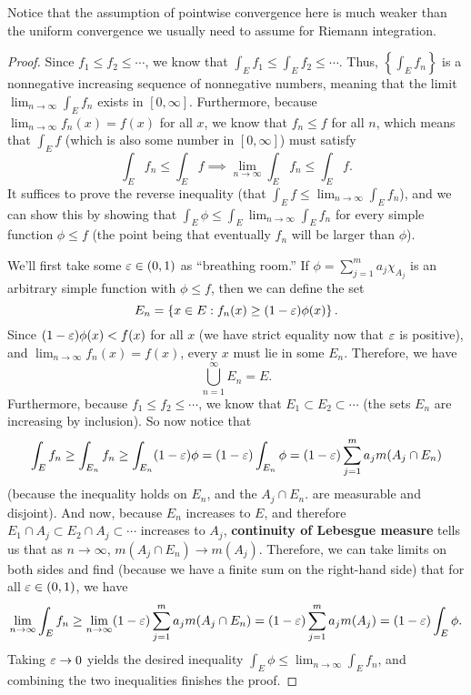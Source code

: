 Notice that the assumption of pointwise convergence here is much weaker than the uniform convergence we usually need to assume for Riemann integration.

\begin{proof}
Since $f_1 \le f_2 \le \cdots$, we know that $\int_E f_1 \le \int_E f_2 \le \cdots$. Thus, $\left\{\int_E f_n\right\}$ is a nonnegative increasing sequence of nonnegative numbers, meaning that the limit $\lim_{n \to \infty} \int_E f_n$ exists in $[0, \infty]$. Furthermore, because $\lim_{n \to \infty} f_n(x) = f(x)$ for all $x$, we know that $f_n \le f$ for all $n$, which means that $\int_E f$ (which is also some number in $[0, \infty]$) must satisfy 
\[
    \int_E f_n \le \int_E f \implies \lim_{n \to \infty}\int_E f_n \le \int_E f.
\]
It suffices to prove the reverse inequality (that $\int_E f \le \lim_{n \to \infty}\int_E f_n$), and we can show this by showing that $\int_E \phi \le \int_E \lim_{n \to \infty}\int_E f_n$ for every simple function $\phi \le f$ (the point being that eventually $f_n$ will be larger than $\phi$). 

We'll first take some $\varepsilon \in (0, 1)$ as ``breathing room.'' If $\phi = \sum_{j=1}^m a_j \chi_{A_j}$ is an arbitrary simple function with $\phi \le f$, then we can define the set
\[
    E_n = \left\{x \in E: f_n(x) \ge (1- \varepsilon) \phi(x)\right\}.
\]
Since $(1 - \varepsilon) \phi(x) < f(x)$ for all $x$ (we have strict equality now that $\varepsilon$ is positive), and $\lim_{n \to \infty} f_n(x) = f(x)$, every $x$ must lie in some $E_n$. Therefore, we have
\[
    \bigcup_{n=1}^{\infty} E_n = E.
\]
Furthermore, because $f_1 \le f_2 \le \cdots$, we know that $E_1 \subset E_2 \subset \cdots$ (the sets $E_n$ are increasing by inclusion). So now notice that
\[
    \int_E f_n \ge \int_{E_n} f_n \ge \int_{E_n} (1 - \varepsilon) \phi = (1-\varepsilon) \int_{E_n} \phi = (1 - \varepsilon) \sum_{j=1}^m a_j m(A_j \cap E_n)
\]
(because the inequality holds on $E_n$, and the $A_j \cap E_n$. are measurable and disjoint). And now, because $E_n$ increases to $E$, and therefore $E_1 \cap A_j \subset E_2 \cap A_j \subset \cdots$ increases to $A_j$, \textbf{continuity of Lebesgue measure} tells us that as $n \to \infty$, $m(A_j \cap E_n) \to m(A_j)$. Therefore, we can take limits on both sides and find (because we have a finite sum on the right-hand side) that for all $\varepsilon \in (0, 1)$, we have
\[
    \lim_{n \to \infty} \int_E f_n \ge \lim_{n \to \infty} (1 - \varepsilon) \sum_{j=1}^m a_j m(A_j \cap E_n) = (1 - \varepsilon) \sum_{j=1}^m a_j m(A_j) = (1 - \varepsilon) \int_E \phi.
\]
Taking $\varepsilon \to 0$ yields the desired inequality $\int_E \phi \le \lim_{n \to \infty} \int_E f_n$, and combining the two inequalities finishes the proof.
\end{proof}

